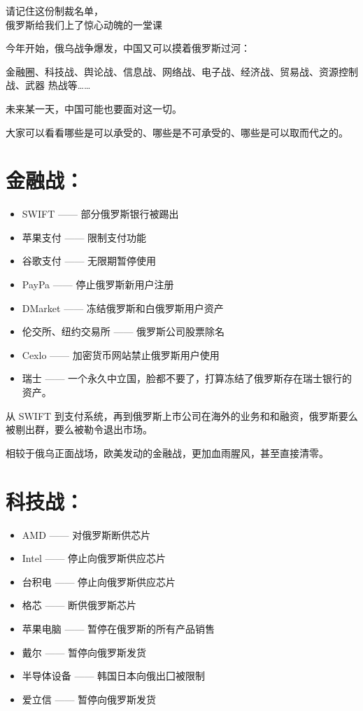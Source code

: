 \documentclass[UTF8, 11pt, oneside]{ctexart}
\begin{document}
\begin{center}
    \LARGE{请记住这份制裁名单，\\ 俄罗斯给我们上了惊心动魄的一堂课}
\end{center}

今年开始，俄乌战争爆发，中国又可以摸着俄罗斯过河：

金融圈、科技战、舆论战、信息战、网络战、电子战、经济战、贸易战、资源控制战、武器
热战等……

未来某一天，中国可能也要面对这一切。

大家可以看看哪些是可以承受的、哪些是不可承受的、哪些是可以取而代之的。

\section{金融战：}

\begin{itemize}
    \item SWIFT —— 部分俄罗斯银行被踢出
    \item 苹果支付 —— 限制支付功能
    \item 谷歌支付 —— 无限期暂停使用
    \item PayPa —— 停止俄罗斯新用户注册
    \item DMarket —— 冻结俄罗斯和白俄罗斯用户资产
    \item 伦交所、纽约交易所 —— 俄罗斯公司股票除名
    \item Cexlo —— 加密货币网站禁止俄罗斯用户使用
    \item 瑞士 —— 一个永久中立国，脸都不要了，打算冻结了俄罗斯存在瑞士银行的资产。
\end{itemize}

从 SWIFT 到支付系统，再到俄罗斯上市公司在海外的业务和和融资，俄罗斯要么被剔出群，要么被勒令退出市场。

相较于俄乌正面战场，欧美发动的金融战，更加血雨腥风，甚至直接清零。



\section{科技战：}

\begin{itemize}
    \item AMD —— 对俄罗斯断供芯片
    \item Intel —— 停止向俄罗斯供应芯片
    \item 台积电 —— 停止向俄罗斯供应芯片
    \item 格芯 —— 断供俄罗斯芯片
    \item 苹果电脑 —— 暂停在俄罗斯的所有产品销售
    \item 戴尔 —— 暂停向俄罗斯发货
    \item 半导体设备 —— 韩国日本向俄出囗被限制
    \item 爱立信 —— 暂停向俄罗斯发货
\end{itemize}
\end{document}
